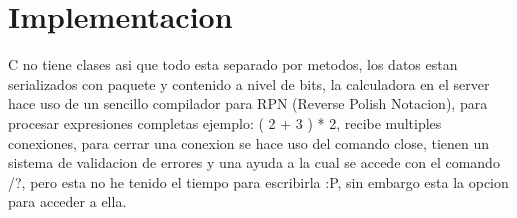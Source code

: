 \documentclass[12pt]{article}
\begin{document}
\section{Implementacion}
  C no tiene clases asi que todo esta separado por metodos, los datos estan serializados con paquete y contenido a nivel de bits, la calculadora en el server hace uso de un sencillo compilador para RPN (Reverse Polish Notacion), para procesar expresiones completas ejemplo: ( 2 + 3 ) * 2, recibe multiples conexiones, para cerrar una conexion se hace uso del comando close, tienen un sistema de validacion de errores y una ayuda a la cual se accede con el comando /?, pero esta no he tenido el tiempo para escribirla :P, sin embargo esta la opcion para acceder a ella.
\end{document}

